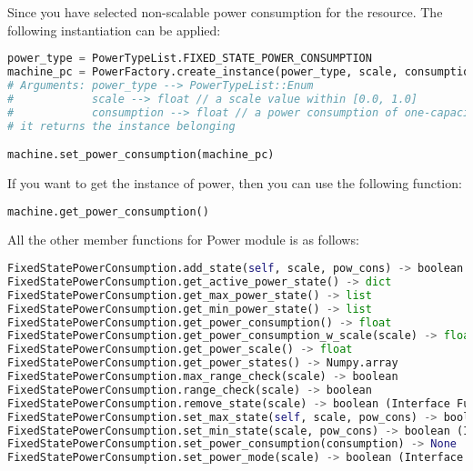 \documentclass[]{scrartcl}
\begin{document}
Since you have selected non-scalable power consumption for the resource. The following instantiation can be applied:

\begin{lstlisting}[language=Python, frame=single, label={lst:machinesettingPowerConsumption}, caption={Initializing power consumption module and setting it to the resource.}]
power_type = PowerTypeList.FIXED_STATE_POWER_CONSUMPTION
machine_pc = PowerFactory.create_instance(power_type, scale, consumption)
# Arguments: power_type --> PowerTypeList::Enum
#            scale --> float // a scale value within [0.0, 1.0]
#            consumption --> float // a power consumption of one-capacity per unit time
# it returns the instance belonging

machine.set_power_consumption(machine_pc)
\end{lstlisting}
        

If you want to get the instance of power, then you can use the following function:

\begin{lstlisting}[language=Python, frame=single, label={lst:machinegettingPowerConsumption}, caption={Getting power consumption module}]
machine.get_power_consumption()
\end{lstlisting}
        
            
All the other member functions for Power module is as follows:
            

\begin{lstlisting}[language=Python, frame=single, label={lst:machinememberFunctionsPower}, caption={The member functions for \textsf{FixedStatePowerConsumption} module.}]
FixedStatePowerConsumption.add_state(self, scale, pow_cons) -> boolean (Interface Function)
FixedStatePowerConsumption.get_active_power_state() -> dict
FixedStatePowerConsumption.get_max_power_state() -> list
FixedStatePowerConsumption.get_min_power_state() -> list
FixedStatePowerConsumption.get_power_consumption() -> float
FixedStatePowerConsumption.get_power_consumption_w_scale(scale) -> float (Interface Function)
FixedStatePowerConsumption.get_power_scale() -> float
FixedStatePowerConsumption.get_power_states() -> Numpy.array
FixedStatePowerConsumption.max_range_check(scale) -> boolean
FixedStatePowerConsumption.range_check(scale) -> boolean
FixedStatePowerConsumption.remove_state(scale) -> boolean (Interface Function)
FixedStatePowerConsumption.set_max_state(self, scale, pow_cons) -> boolean (Interface Function)
FixedStatePowerConsumption.set_min_state(scale, pow_cons) -> boolean (Interface Function)
FixedStatePowerConsumption.set_power_consumption(consumption) -> None
FixedStatePowerConsumption.set_power_mode(scale) -> boolean (Interface Function)
\end{lstlisting}
        
            
\end{document}
